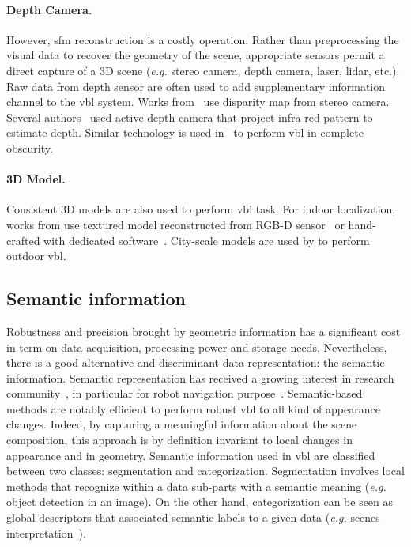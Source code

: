 		\paragraph{Depth Camera.}
			However, \ac{sfm} reconstruction is a costly operation. Rather than preprocessing the visual data to recover the geometry of the scene, appropriate sensors permit a direct capture of a 3D scene (\textit{e.g.} stereo camera, depth camera, laser, lidar, etc.). Raw data from depth sensor are often used to add supplementary information channel to the \ac{vbl} system. Works from~\citep{Ni2009,McManus2014,Wan2014} use disparity map from stereo camera. Several authors~\citep{Shotton2013,Guzman-rivera2014,Glocker2015} used active depth camera that project infra-red pattern to estimate depth. Similar technology is used in~\citep{Li2016a} to perform \ac{vbl} in complete obscurity. 

		\paragraph{3D Model.} 
			Consistent 3D models are also used to perform \ac{vbl} task.  For indoor localization, works from \citep{Shotton2013,Pascoe2015} use textured model reconstructed from RGB-D sensor~\citep{Shotton2013} or hand-crafted with dedicated software~\citep{Pascoe2015}. City-scale models are used by \citep{Aubry2014,Poglitsch2015,Pascoe2015a,Pascoe2015b,Caselitz2016} to perform outdoor \ac{vbl}. 

	\subsection{Semantic information}
		\label{subsec:semantic_info}
		Robustness and precision brought by geometric information has a significant cost in term on data acquisition, processing power and storage needs. Nevertheless, there is a good alternative and discriminant data representation: the semantic information. Semantic representation has received a growing interest in research community~\citep{Liu2016a}, in particular for robot navigation purpose~\citep{Kostavelis2015}. Semantic-based methods are notably efficient to perform robust \ac{vbl} to all kind of appearance changes. Indeed, by capturing a meaningful information about the scene composition, this approach is by definition invariant to local changes in appearance and in geometry. Semantic information used in \ac{vbl} are classified between two classes: segmentation and categorization. Segmentation involves local methods that recognize within a data sub-parts with a semantic meaning (\textit{e.g.} object detection in an image). On the other hand, categorization can be seen as global descriptors that associated semantic labels to a given data (\textit{e.g.} scenes interpretation~\citep{Deng2009}).
		
